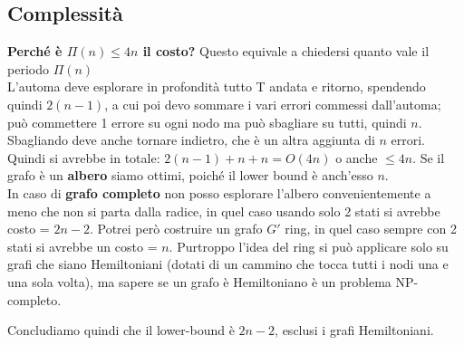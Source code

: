 \subsection{Complessità}
\textbf{Perché è $\Pi(n) \leq 4n$ il costo?} Questo equivale a chiedersi quanto
vale il periodo $\Pi(n)$\\

L'automa deve esplorare in profondità tutto T andata e ritorno, spendendo quindi
$2(n-1)$, a cui poi devo sommare i vari errori commessi dall'automa; può
commettere 1 errore su ogni nodo ma può sbagliare su tutti, quindi $n$.
Sbagliando deve anche tornare indietro, che è un altra aggiunta di $n$ errori.
Quindi si avrebbe in totale: $2(n-1)+n+n = O(4n) $ o anche $\leq 4n$. Se il
grafo è un \textbf{albero} siamo ottimi, poiché il lower bound è anch'esso
$n$.\\
In caso di \textbf{grafo completo} non posso esplorare l'albero convenientemente
a meno che non si parta dalla radice, in quel caso usando solo 2 stati si
avrebbe costo = $2n-2$. Potrei però costruire un grafo $G'$ ring, in quel caso
sempre con 2 stati si avrebbe un costo = $n$. Purtroppo l'idea del ring si può
applicare solo su grafi che siano Hemiltoniani (dotati di un cammino che tocca
tutti i nodi una e una sola volta), ma sapere se un grafo è Hemiltoniano è un
problema NP-completo.

Concludiamo quindi che il lower-bound è $2n-2$, esclusi i grafi Hemiltoniani.

